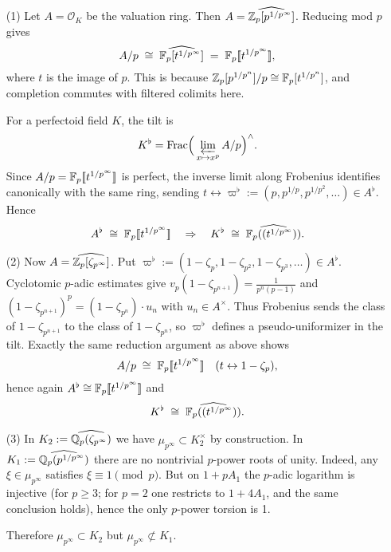 \documentclass[12pt]{article}  %
\newcommand{\llbracket}{[\![}
\newcommand{\rrbracket}{]\!]}
\begin{document}
\begin{solution}
  \leavevmode
\begin{enumerate}
\item[(1)] Let $A=\mathcal O_K$ be the valuation ring. Then 
$A=\widehat{\mathbb{Z}_p[p^{1/p^\infty}]}$.
Reducing mod $p$ gives
\[
A/p \;\cong\; \widehat{\F_p[t^{1/p^\infty}]}\;=\;\F_p\llbracket t^{1/p^\infty}\rrbracket,
\]
where $t$ is the image of $p$. This is because $\mathbb{Z}_p[p^{1/p^n}]/p\cong \mathbb{F}_p[t^{1/p^n}]$, and completion commutes with filtered colimits here.

For a perfectoid field $K$, the tilt is
\[
K^\flat=\operatorname{Frac}\!\Big(\varprojlim_{x\mapsto x^p} A/p\Big)^\wedge.
\]
Since $A/p=\F_p\llbracket t^{1/p^\infty}\rrbracket$ is perfect, the inverse limit along Frobenius identifies canonically with the same ring, sending
$t \longleftrightarrow \varpi^\flat:=(p,p^{1/p},p^{1/p^2},\dots)\in A^\flat$.
Hence
\[
A^\flat \;\cong\; \F_p\llbracket t^{1/p^\infty}\rrbracket
\quad\Rightarrow\quad
K^\flat\;\cong\; \widehat{\F_p((t^{1/p^\infty}))}.
\]

\item[(2)] Now $A=\widehat{\mathbb{Z}_p[\zeta_{p^\infty}]}$. Put 
$\varpi^\flat:=(1-\zeta_p, 1-\zeta_{p^2}, 1-\zeta_{p^3},\dots)\in A^\flat$.
Cyclotomic $p$-adic estimates give
$v_p(1-\zeta_{p^{n+1}})=\frac{1}{p^n(p-1)}$
and $(1-\zeta_{p^{n+1}})^p=(1-\zeta_{p^n})\cdot u_n$
with $u_n\in A^\times$. Thus Frobenius sends the class of $1-\zeta_{p^{n+1}}$ to the class of $1-\zeta_{p^n}$, so $\varpi^\flat$ defines a pseudo-uniformizer in the tilt. Exactly the same reduction argument as above shows
\[
A/p \;\cong\; \F_p\llbracket t^{1/p^\infty}\rrbracket
\quad(t\leftrightarrow 1-\zeta_p),
\]
hence again $A^\flat\cong\F_p\llbracket t^{1/p^\infty}\rrbracket$ and
\[
K^\flat \;\cong\; \widehat{\mathbb{F}_p((t^{1/p^\infty}))}.
\]

\item[(3)] In $K_2:=\widehat{\mathbb{Q}_p(\zeta_{p^\infty})}$ we have $\mu_{p^\infty}\subset K_2^\times$ by construction.
In $K_1:=\widehat{\mathbb{Q}_p(p^{1/p^\infty})}$ there are no nontrivial $p$-power roots of unity. Indeed, any $\xi\in\mu_{p^\infty}$ satisfies $\xi\equiv1\pmod p$. But on $1+pA_1$ the $p$-adic logarithm is injective (for $p\ge3$; for $p=2$ one restricts to $1+4A_1$, and the same conclusion holds), hence the only $p$-power torsion is 1.

Therefore $\mu_{p^\infty}\subset K_2$ but $\mu_{p^\infty}\not\subset K_1$. 
\end{enumerate}
\end{solution}
\end{document}

